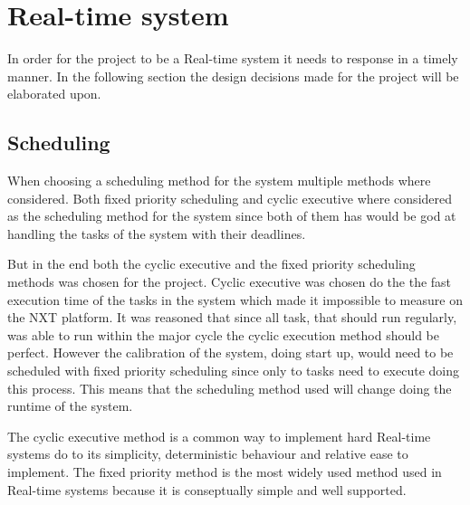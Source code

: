 \section{Real-time system}\label{Design:RTS} 
In order for the project to be a Real-time system it needs to response in a timely manner. 
In the following section the design decisions made for the project will be elaborated upon. 


\subsection{Scheduling}
When choosing a scheduling method for the system multiple  methods where considered. 
Both fixed priority scheduling and cyclic executive where considered as the scheduling method for the system since both of them has would be god at handling the tasks of the system with their deadlines.

But in the end both the cyclic executive and the fixed priority scheduling methods was chosen for the project. 
Cyclic executive was chosen do the the fast execution time of the tasks in the system which made it impossible to measure on the NXT platform. 
It was reasoned that since all task, that should run regularly, was able to run within the major cycle the cyclic execution method should be perfect. 
However the calibration of the system, doing start up, would need to be scheduled with fixed priority scheduling since only to tasks need to execute doing this process. 
This means that the scheduling method used will change doing the runtime of the system. 

The cyclic executive method is a common way to implement hard Real-time systems do to its simplicity, deterministic behaviour and relative ease to implement\cite{CyclicExecutionKimLarsen}.
The fixed priority method is the most widely used method used in Real-time systems because it is conseptually simple and well supported\cite{TaskBasedSchedulingKimLarsen}.